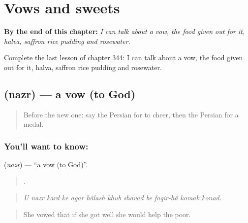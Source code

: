 
\chapter{Vows and sweets}
\label{ch:fa-vows-and-sweets}

\begin{chapteropening}
\textbf{By the end of this chapter:} \emph{I can talk about a vow, the food given out for it, halva, saffron rice pudding and rosewater.}

Complete the last lesson of chapter 344: I can talk about a vow, the food given out for it, halva, saffron rice pudding and rosewater.
\end{chapteropening}

\section[\texorpdfstring{\fa{نذر} (nazr)}{نذر (nazr)}]{ (nazr) — a vow (to God)}

\label{lesson:FA-C344-nazr}



\begin{quote}
Before the new one: say the Persian for to cheer, then the Persian for a medal.
\end{quote}

\subsection*{You'll want to know: }
\textbf{} (\emph{nazr}) — \textquotedblleft{}a vow (to God)\textquotedblright{}.

\begin{quote}
           .
\end{quote}

\begin{quote}
\emph{U nazr kard ke agar hâlash khub shavad be faqir-hâ komak konad.}
\end{quote}

\begin{quote}
She vowed that if she got well she would help the poor.
\end{quote}

